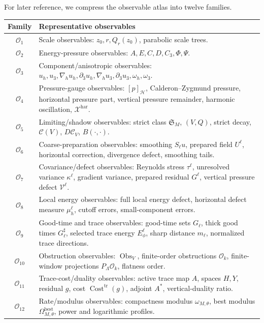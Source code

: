 \documentclass[11pt]{article}
\numberwithin{equation}{section}
\DeclareMathOperator{\Cost}{Cost}
\newcommand{\har}{\mathrm{har}}
\newcommand{\trc}{\mathrm{tr}}
\newcommand{\nabh}{\nabla_h}
\newcommand{\calC}{\mathcal C}
\newcommand{\calH}{\mathcal H}
\newcommand{\calO}{\mathcal O}
\newcommand{\calV}{\mathcal V}
\newcommand{\calX}{\mathcal X}
\newcommand{\frakS}{\mathfrak S}
\newcommand{\Obs}{\operatorname{Obs}}
\begin{document}
For later reference, we compress the observable atlas into twelve families.

\begin{center}
\begin{tabularx}{\textwidth}{@{}cX@{}}
\toprule
Family & Representative observables \\
\midrule
\(\calO_1\) & Scale observables: \(z_0,r,Q_r(z_0)\), parabolic scale trees. \\
\(\calO_2\) & Energy-pressure observables: \(A,E,C,D,C_3,\Phi,\Psi\). \\
\(\calO_3\) & Component/anisotropic observables: \(u_h,u_3,\nabh u_h,\partial_3u_h,\nabh u_3,\partial_3u_3,\omega_h,\omega_3\). \\
\(\calO_4\) & Pressure-gauge observables: \([p]_{\calH}\), Calderon--Zygmund pressure, horizontal pressure part, vertical pressure remainder, harmonic oscillation, \(\calX^{\har}\). \\
\(\calO_5\) & Limiting/shadow observables: strict class \(\frakS_M\), \((V,Q)\), strict decay, \(\calC(V)\), \(D\calC_V\), \(B(\cdot,\cdot)\). \\
\(\calO_6\) & Coarse-preparation observables: smoothing \(S_\ell u\), prepared field \(U^\ell\), horizontal correction, divergence defect, smoothing tails. \\
\(\calO_7\) & Covariance/defect observables: Reynolds stress \(\tau^\ell\), unresolved variance \(\kappa^\ell\), gradient variance, prepared residual \(G^\ell\), vertical pressure defect \(\calV^\ell\). \\
\(\calO_8\) & Local energy observables: full local energy defect, horizontal defect measure \(\mu_h^\ell\), cutoff errors, small-component errors. \\
\(\calO_9\) & Good-time and trace observables: good-time sets \(G_\ell\), thick good times \(G^\sharp_\ell\), selected trace energy \(E^\ell_\phi\), sharp distance \(m_\ell\), normalized trace directions. \\
\(\calO_{10}\) & Obstruction observables: \(\Obs_V\), finite-order obstructions \(\calO_k\), finite-window projections \(P_\Lambda\calO_k\), flatness order. \\
\(\calO_{11}\) & Trace-cost/duality observables: active trace map \(A\), spaces \(H,Y\), residual \(g\), cost \(\Cost^{\trc}(g)\), adjoint \(A^*\), vertical-duality ratio. \\
\(\calO_{12}\) & Rate/modulus observables: compactness modulus \(\omega_{M,\theta}\), best modulus \(\Omega^{\mathrm{best}}_{M,\theta}\), power and logarithmic profiles. \\
\bottomrule
\end{tabularx}
\end{center}
\end{document}
